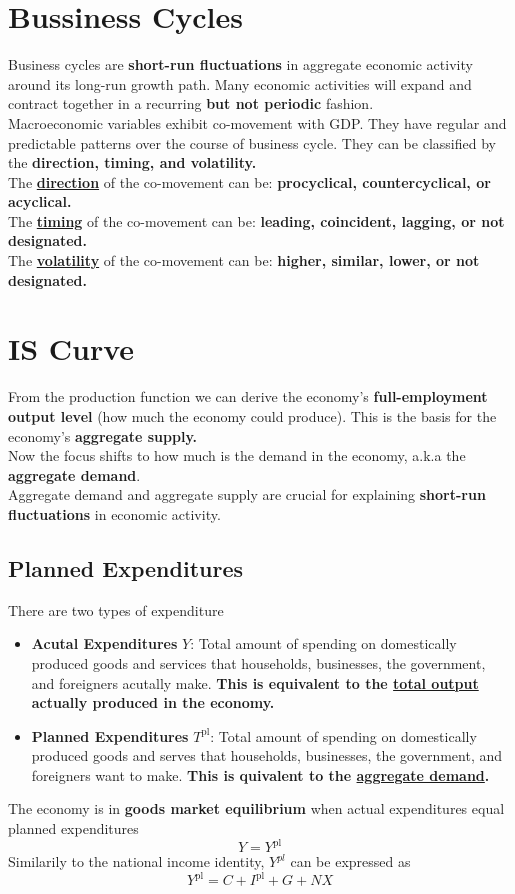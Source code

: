 \documentclass[a4paper]{article}
\begin{document}
\section{Bussiness Cycles}
Business cycles are \textbf{short-run fluctuations} in aggregate economic activity 
around its long-run growth path. Many economic activities will expand and contract 
together in a recurring \textbf{but not periodic} fashion. \smallskip \\
%
Macroeconomic variables exhibit co-movement with GDP. They have regular and
predictable patterns over the course of business cycle. They can be 
classified by the \textbf{direction, timing, and volatility.} \smallskip \\
%
The \underline{\textbf{direction}} of the co-movement can be: \textbf{procyclical, countercyclical, or
acyclical.} 
\smallskip \\
The \underline{\textbf{timing}} of the co-movement can be: 
\textbf{leading, coincident, lagging, or
not designated.} \smallskip \\
The \underline{\textbf{volatility}} of the co-movement can be: \textbf{higher, similar, lower, or
not designated.}  


\section{IS Curve}
From the production function we can derive the economy's 
\textbf{full-employment output level} 
(how much the economy could produce). This is the basis for the 
economy's \textbf{aggregate supply.} \smallskip \\
%
Now the focus shifts to how much is the demand in the economy, a.k.a the 
\textbf{aggregate demand}. \smallskip \\
%
Aggregate demand and aggregate supply are crucial for explaining \textbf{short-run 
fluctuations} in economic activity.
\subsection{Planned Expenditures}
There are two types of expenditure \begin{itemize}
    \item \textbf{Acutal Expenditures} $Y$: Total amount of spending on 
    domestically produced goods and services that households, businesses, the 
    government, and foreigners acutally make. \textbf{This is equivalent to the \underline{total 
    output} actually produced in the economy.}
    \item \textbf{Planned Expenditures} $T^{\text{pl}}$: Total amount of spending on 
    domestically produced goods and serves that households, businesses, the 
    government, and foreigners want to make. \textbf{This is quivalent to the 
    \underline{aggregate demand}.}
\end{itemize}
The economy is in \textbf{goods market equilibrium} when actual expenditures equal planned 
expenditures
\[ Y = Y^{\text{pl}} \]
Similarily to the national income identity, $Y^{pl}$ can be expressed as
\[ Y^{\text{pl}} = C + I^{\text{pl}} + G + NX \]
\end{document}

